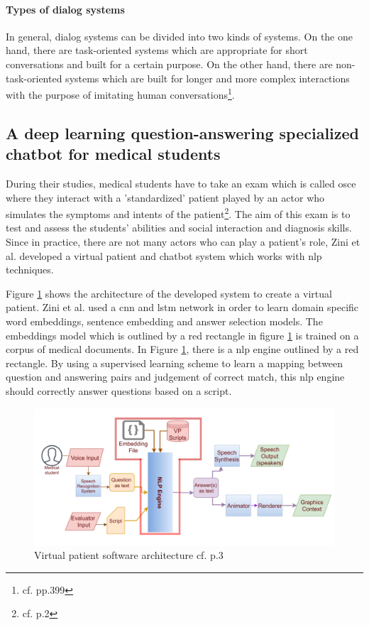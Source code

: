 \paragraph{Types of dialog systems}
In general, dialog systems can be divided into two kinds of systems. On the one hand, there are task-oriented systems which are appropriate for short conversations and built for a certain purpose. On the other hand, there are non-task-oriented systems which are built for longer and more complex interactions with the purpose of imitating human conversations\footnote{cf.\autocite{akhtar} pp.399}.

\subsection{A deep learning question-answering specialized chatbot for medical students}
During their studies, medical students have to take an exam which is called \ac{osce} where they interact with a 'standardized' patient played by an actor who simulates the symptoms and intents of the patient\footnote{cf.\autocite{zini} p.2}. The aim of this exam is to test and assess the students' abilities and social interaction and diagnosis skills.
Since in practice, there are not many actors who can play a patient's role, Zini et al. developed a virtual patient and chatbot system which works with \ac{nlp} techniques.

Figure \ref{vp_architecture} shows the architecture of the developed system to create a virtual patient. Zini et al. used a \ac{cnn} and \ac{lstm} network in order to learn domain specific word embeddings, sentence embedding and answer selection models.
The embeddings model which is outlined by a red rectangle in figure \ref{vp_architecture} is trained on a corpus of medical documents.
In Figure \ref{vp_architecture}, there is a \ac{nlp} engine outlined by a red rectangle. By using a supervised learning scheme to learn a mapping between question and answering pairs and judgement of correct match, this \ac{nlp} engine should correctly answer questions based on a script.

\begin{figure}[htbp]
	\centering
	\includegraphics[width=1\textwidth]{images/vp_architecture.png}
	\caption{Virtual patient software architecture cf.\autocite{zini} p.3}
	\label{vp_architecture}
\end{figure}

